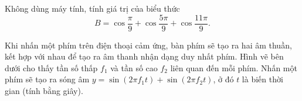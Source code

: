 \begin{vd}%
	Không dùng máy tính, tính giá trị của biểu thức
	$$
	B=\cos \dfrac{\pi}{9}+\cos \dfrac{5 \pi}{9}+\cos \dfrac{11 \pi}{9} .
	$$
\end{vd}

\begin{vd}%
	Khi nhấn một phím trên điện thoại cảm ứng, bàn phím sẽ tạo ra hai âm thuần, kết hợp với nhau để tạo ra âm thanh nhận dạng duy nhất phím. Hình vẽ bên dưới cho thấy tần số thấp $f_1$ và tần số cao $f_2$ liên quan đến mỗi phím. Nhấn một phím sẽ tạo ra sóng âm $y=\sin \left(2 \pi f_1 t\right)+\sin \left(2 \pi f_2 t\right)$, ở đó $t$ là biến thời gian (tính bằng giây).
	\begin{center}
		\begin{tikzpicture}[scale=1.3,>=stealth, font=\footnotesize, line join=round, line cap=round]
			

\end{tikzpicture}
\end{center}
\end{vd}
